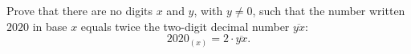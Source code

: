 Prove that there are no digits $x$ and $y$, with $y\ne0$, such that the number written $2020$ in base $x$ equals twice the two-digit decimal number $\overline{yx}$:
\[2020_{(x)}=2\cdot\overline{yx}.\]
